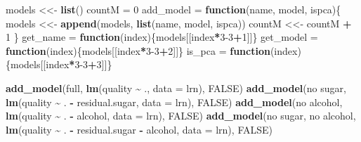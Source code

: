 \documentclass[
]{article}
\newenvironment{Shaded}{\begin{snugshade}}{\end{snugshade}}
\newcommand{\AttributeTok}[1]{\textcolor[rgb]{0.13,0.29,0.53}{#1}}
\newcommand{\ConstantTok}[1]{\textcolor[rgb]{0.56,0.35,0.01}{#1}}
\newcommand{\ControlFlowTok}[1]{\textcolor[rgb]{0.13,0.29,0.53}{\textbf{#1}}}
\newcommand{\DecValTok}[1]{\textcolor[rgb]{0.00,0.00,0.81}{#1}}
\newcommand{\FunctionTok}[1]{\textcolor[rgb]{0.13,0.29,0.53}{\textbf{#1}}}
\newcommand{\NormalTok}[1]{#1}
\newcommand{\OtherTok}[1]{\textcolor[rgb]{0.56,0.35,0.01}{#1}}
\newcommand{\SpecialCharTok}[1]{\textcolor[rgb]{0.81,0.36,0.00}{\textbf{#1}}}
\newcommand{\StringTok}[1]{\textcolor[rgb]{0.31,0.60,0.02}{#1}}
\begin{document}
\begin{Shaded}
\begin{Highlighting}[]
\NormalTok{models }\OtherTok{\textless{}\textless{}{-}} \FunctionTok{list}\NormalTok{()}
\NormalTok{countM  }\OtherTok{=} \DecValTok{0}
\NormalTok{add\_model }\OtherTok{=} \ControlFlowTok{function}\NormalTok{(name, model, ispca)\{}
\NormalTok{  models }\OtherTok{\textless{}\textless{}{-}} \FunctionTok{append}\NormalTok{(models, }\FunctionTok{list}\NormalTok{(name, model, ispca))}
\NormalTok{  countM }\OtherTok{\textless{}\textless{}{-}}\NormalTok{ countM }\SpecialCharTok{+} \DecValTok{1}
\NormalTok{\}}
\NormalTok{get\_name  }\OtherTok{=} \ControlFlowTok{function}\NormalTok{(index)\{models[[index}\SpecialCharTok{*}\DecValTok{3{-}3}\SpecialCharTok{+}\DecValTok{1}\NormalTok{]]\}}
\NormalTok{get\_model }\OtherTok{=} \ControlFlowTok{function}\NormalTok{(index)\{models[[index}\SpecialCharTok{*}\DecValTok{3{-}3}\SpecialCharTok{+}\DecValTok{2}\NormalTok{]]\}}
\NormalTok{is\_pca    }\OtherTok{=} \ControlFlowTok{function}\NormalTok{(index)\{models[[index}\SpecialCharTok{*}\DecValTok{3{-}3}\SpecialCharTok{+}\DecValTok{3}\NormalTok{]]\}}

\FunctionTok{add\_model}\NormalTok{(}\StringTok{\textquotesingle{}full\textquotesingle{}}\NormalTok{,                 }\FunctionTok{lm}\NormalTok{(quality }\SpecialCharTok{\textasciitilde{}}\NormalTok{ .,                            }\AttributeTok{data =}\NormalTok{ lrn), }\ConstantTok{FALSE}\NormalTok{)}
\FunctionTok{add\_model}\NormalTok{(}\StringTok{\textquotesingle{}no sugar\textquotesingle{}}\NormalTok{,             }\FunctionTok{lm}\NormalTok{(quality }\SpecialCharTok{\textasciitilde{}}\NormalTok{ . }\SpecialCharTok{{-}}\NormalTok{ residual.sugar,           }\AttributeTok{data =}\NormalTok{ lrn), }\ConstantTok{FALSE}\NormalTok{)}
\FunctionTok{add\_model}\NormalTok{(}\StringTok{\textquotesingle{}no alcohol\textquotesingle{}}\NormalTok{,           }\FunctionTok{lm}\NormalTok{(quality }\SpecialCharTok{\textasciitilde{}}\NormalTok{ .                  }\SpecialCharTok{{-}}\NormalTok{ alcohol, }\AttributeTok{data =}\NormalTok{ lrn), }\ConstantTok{FALSE}\NormalTok{)}
\FunctionTok{add\_model}\NormalTok{(}\StringTok{\textquotesingle{}no sugar, no alcohol\textquotesingle{}}\NormalTok{, }\FunctionTok{lm}\NormalTok{(quality }\SpecialCharTok{\textasciitilde{}}\NormalTok{ . }\SpecialCharTok{{-}}\NormalTok{ residual.sugar }\SpecialCharTok{{-}}\NormalTok{ alcohol, }\AttributeTok{data =}\NormalTok{ lrn), }\ConstantTok{FALSE}\NormalTok{)}
\end{Highlighting}
\end{Shaded}
\end{document}
